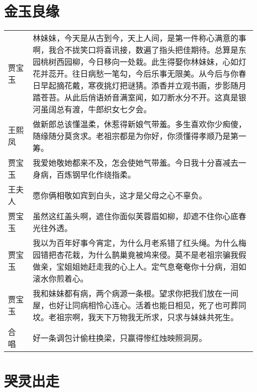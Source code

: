 \documentclass{article}
\newenvironment{lpar}{\vspace{-1ex}\begin{longtable}{lp{0.85\columnwidth}}}{\end{longtable}}
\newcommand\lver[2]{\vspace{1ex}#1&#2\\}
\begin{document}
\section{金玉良缘}

\begin{lpar}
\lver{贾宝玉}{林妹妹，今天是从古到今，天上人间，是第一件称心满意的事啊，我合不拢笑口将喜讯接，数遍了指头把佳期待。总算是东园桃树西园柳，今日移向一处栽。此生得娶你林妹妹，心如灯花并蕊开。往日病愁一笔勾，今后乐事无限美。从今后与你春日早起摘花戴，寒夜挑灯把谜猜。添香并立观书画，步影随月踏苍苔。从此后俏语娇音满室闻，如刀断水分不开。这真是银河虽阔总有渡，牛郎织女七夕会。}
\lver{王熙凤}{做新郎总该懂温柔，休惹得新娘气带羞。多生喜欢你少痴傻，随缘随分莫贪求。老祖宗都是为你好，你须懂得孝顺乃是第一筹。}
\lver{贾宝玉}{我爱她敬她都来不及，怎会使她气带羞。今日我十分喜减去一身病，百炼钢早化作绕指柔。}
\lver{王夫人}{愿你俩相敬如宾到白头，这才是父母之心不辜负。}
\lver{贾宝玉}{虽然这红盖头啊，遮住你面似芙蓉眉如柳，却遮不住你心底春光往外透。}
\lver{贾宝玉}{我以为百年好事今宵定，为什么月老系错了红头绳。为什么梅园错把杏花栽，为什么鹊巢竟被鸠来侵。莫不是老祖宗骗我假做亲，宝姐姐她赶走我的心上人。定气息奄奄你十分病，泪如滚水你煎着心。}
\lver{贾宝玉}{我和妹妹都有病，两个病源一条根。望求你把我们放在一间屋，也好让同病相怜心连心。活着也能日相见，死了也可葬同坟。老祖宗啊，我天下万物我无所求，只求与妹妹共死生。}
\lver{合　唱}{好一条调包计偷柱换梁，只赢得惨红烛映照洞房。}
\end{lpar}

\section{哭灵出走}
\end{document}

